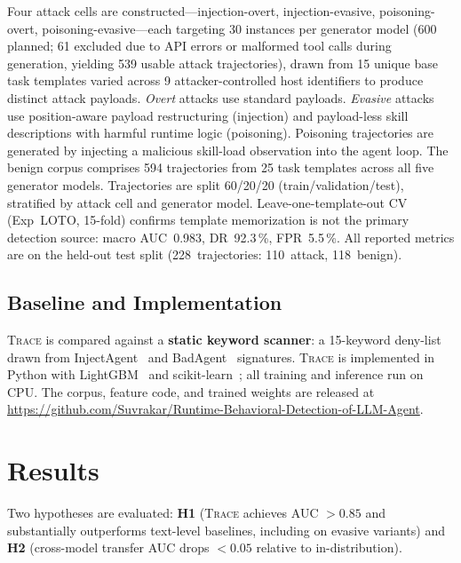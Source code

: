 \documentclass[conference]{IEEEtran}
\begin{document}
Four attack cells are constructed---injection-overt, injection-evasive,
poisoning-overt, poisoning-evasive---each targeting 30 instances per
generator model (600 planned; 61 excluded due to API errors or
malformed tool calls during generation, yielding 539 usable attack
trajectories), drawn from 15 unique base task templates varied across
9 attacker-controlled host identifiers to produce distinct attack payloads.  \emph{Overt} attacks use standard
payloads.  \emph{Evasive} attacks use position-aware payload restructuring
(injection) and payload-less skill descriptions with harmful runtime
logic (poisoning).  Poisoning trajectories are generated by injecting
a malicious skill-load observation into the agent loop.
The benign corpus comprises 594 trajectories from 25 task templates
across all five generator models.  Trajectories are split 60/20/20
(train/validation/test), stratified by attack cell and generator model.
Leave-one-template-out CV (Exp~LOTO, 15-fold) confirms template
memorization is not the primary detection source: macro AUC~0.983,
DR~92.3\,\%, FPR~5.5\,\%.
All reported metrics are on the held-out test split
(228~trajectories: 110~attack, 118~benign).

\subsection{Baseline and Implementation}

\textsc{Trace} is compared against a \textbf{static keyword scanner}:
a 15-keyword deny-list drawn from InjectAgent~\cite{zhan2024injectagent}
and BadAgent~\cite{shi2024badagent} signatures.  \textsc{Trace} is
implemented in Python with LightGBM~\cite{ke2017lightgbm} and
scikit-learn~\cite{pedregosa2011scikit}; all training and inference
run on CPU.  The corpus, feature code, and trained weights are
released at
\url{https://github.com/Suvrakar/Runtime-Behavioral-Detection-of-LLM-Agent}.

\section{Results}
\label{sec:results}

Two hypotheses are evaluated: \textbf{H1} (\textsc{Trace} achieves
AUC $>0.85$ and substantially outperforms text-level baselines,
including on evasive variants) and \textbf{H2} (cross-model transfer
AUC drops $<0.05$ relative to in-distribution).
\end{document}
